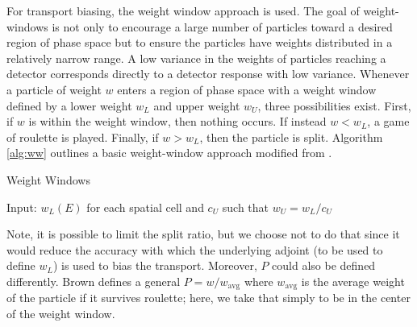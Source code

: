 \documentclass[letter,11pt]{article}
\begin{document}
For transport biasing, the weight window approach is used.  The goal of weight-windows is not only to encourage a large number of particles toward a desired region of phase space but to ensure the particles have weights distributed in a relatively narrow range.  A low variance in the weights of particles reaching a detector corresponds directly to a detector response with low variance.  Whenever a particle of weight $w$ enters a region of phase space with a weight window defined by a lower weight $w_L$ and upper weight $w_U$, three possibilities exist.  First, if $w$ is within the weight window, then nothing occurs.  If instead $w < w_L$, a game of roulette is played.  Finally, if $w > w_L$, then the particle is split. Algorithm \ref{alg:ww} outlines a basic weight-window approach modified from \cite{brown2005fmc}.

\begin{algorithm}
 \caption{Weight Windows}
    Input: $w_L(E)$ for each spatial cell and $c_U$ such that $w_U = w_L/c_U$ \;
 \label{alg:ww}
\end{algorithm}

Note, it is possible to limit the split ratio, but we choose not to do that since it would reduce the accuracy with which the underlying adjoint (to be used to define $w_L$) is used to bias the transport.  Moreover, $P$ could also be defined differently.  Brown defines a general $P = w/w_{\mathrm{avg}}$ where $w_{\mathrm{avg}}$ is the average weight of the particle if it survives roulette; here, we take that simply to be in the center of the weight window.  %
\end{document}
